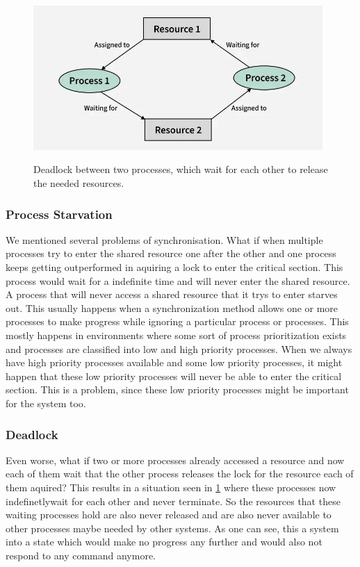 \begin{figure}[!ht]
   \centering
   \captionsetup{justification=centering}
   \caption{Deadlock between two processes, which wait for each other to release the needed resources.}
   \includegraphics[width=110mm]{images/deadlock.png}
   \cite{Deadlock}
   \label{fig:deadlock}
\end{figure}

\subsubsection{Process Starvation}\label{subsubsec:process-starvation}

We mentioned several problems of synchronisation. What if when multiple processes try to enter the shared resource one after the other and one process keeps getting outperformed in aquiring a lock to enter the critical section. This process would wait for a indefinite time and will never enter the shared resource. A process that will never access a shared resource that it trys to enter starves out. This usually happens when a synchronization method allows one or more processes to make progress while ignoring a particular process or processes. This mostly happens in environments where some sort of process prioritization exists and processes are classified into low and high priority processes. When we always have high priority processes available and some low priority processes, it might happen that these low priority processes will never be able to enter the critical section. This is a problem, since these low priority processes might be important for the system too. \cite{Starvation}

\subsubsection{Deadlock}\label{subsubsec:deadlock}

Even worse, what if two or more processes already accessed a resource and now each of them wait that the other process releases the lock for the resource each of them aquired? This results in a situation  seen in \cref{fig:deadlock} where these processes now indefinetlywait for each other and never terminate. So the resources that these waiting processes hold are also never released and are also never available to other processes maybe needed by other systems. As one can see, this a system into a state which would make no progress any further and would also not respond to any command anymore. \cite{Deadlock,chahar2013deadlock}

